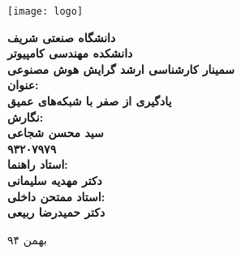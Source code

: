 \thispagestyle{empty}
\begin{center}
\texttt{[image: logo]}
\vskip 1cm
{\bf
دانشگاه صنعتی شریف\\ دانشکده مهندسی کامپیوتر\\ سمینار کارشناسی ارشد گرایش هوش مصنوعی\\
\vskip 1cm
عنوان:\\
یادگیری از صفر با شبکه‌های عمیق\\
\vskip 1cm
نگارش:\\
سید محسن شجاعی\\
۹۳۲۰۷۹۷۹\\
\vskip 1cm
استاد راهنما:\\
دکتر مهدیه سلیمانی\\
\vskip 1cm
استاد ممتحن داخلی:\\
دکتر حمیدرضا ربیعی\\

\vskip 3.5cm

}
بهمن ۹۴
\newpage
\end{center}



